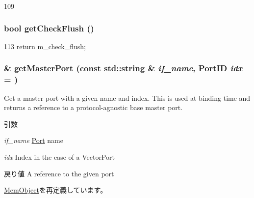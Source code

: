 \begin{DoxyCode}
109 {}
\end{DoxyCode}
\hypertarget{classRubyTester_ae69c65056b8f5eb9fee22f365c58662c}{
\subsubsection[{getCheckFlush}]{\setlength{\rightskip}{0pt plus 5cm}bool getCheckFlush ()}}
\label{classRubyTester_ae69c65056b8f5eb9fee22f365c58662c}



\begin{DoxyCode}
113 { return m_check_flush; }
\end{DoxyCode}
\hypertarget{classRubyTester_adc4e675e51defbdd1e354dac729d0703}{
\subsubsection[{getMasterPort}]{ \& getMasterPort (const std::string \& {\em if\_\-name}, \/  {\bf PortID} {\em idx} = {})}}
\label{classRubyTester_adc4e675e51defbdd1e354dac729d0703}
Get a master port with a given name and index. This is used at binding time and returns a reference to a protocol-\/agnostic base master port.


\begin{DoxyParams}{引数}
\item[{\em if\_\-name}]\hyperlink{classPort}{Port} name \item[{\em idx}]Index in the case of a VectorPort\end{DoxyParams}
\begin{DoxyReturn}{戻り値}
A reference to the given port 
\end{DoxyReturn}


\hyperlink{classMemObject_adc4e675e51defbdd1e354dac729d0703}{MemObject}を再定義しています。


